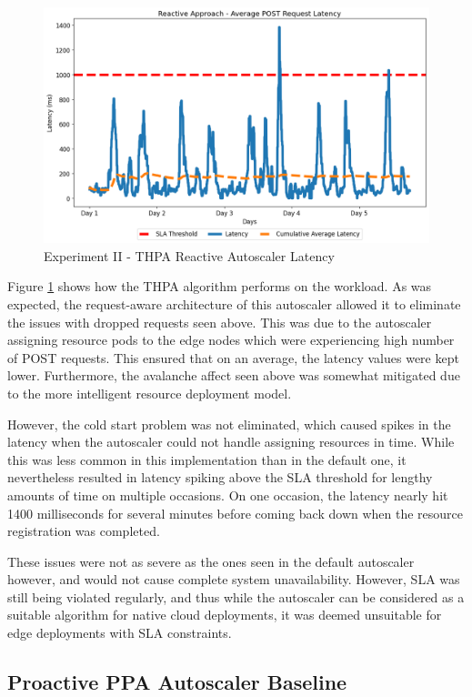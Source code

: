 \begin{figure}[htb]
    \centering
    \caption{Experiment II - THPA Reactive Autoscaler Latency}
    \label{fig:exp2-reactive-k8s}
    \includegraphics[width=0.6\linewidth]{Figures/Compose-Post-Reactive-Latency.png}
\end{figure}

Figure \ref{fig:exp2-reactive-k8s} shows how the THPA algorithm performs on the workload. As was expected, the request-aware architecture of this autoscaler allowed it to eliminate the issues with dropped requests seen above. This was due to the autoscaler assigning resource pods to the edge nodes which were experiencing high number of POST requests. This ensured that on an average, the latency values were kept lower. Furthermore, the avalanche affect seen above was somewhat mitigated due to the more intelligent resource deployment model.\par

However, the cold start problem was not eliminated, which caused spikes in the latency when the autoscaler could not handle assigning resources in time. While this was less common in this implementation than in the default one, it nevertheless resulted in latency spiking above the SLA threshold for lengthy amounts of time on multiple occasions. On one occasion, the latency nearly hit 1400 milliseconds for several minutes before coming back down when the resource registration was completed.\par

These issues were not as severe as the ones seen in the default autoscaler however, and would not cause complete system unavailability. However, SLA was still being violated regularly, and thus while the autoscaler can be considered as a suitable algorithm for native cloud deployments, it was deemed unsuitable for edge deployments with SLA constraints.\par

\subsection {Proactive PPA Autoscaler Baseline}
\label{subsec:ch5-exp2-proactive-algo}

